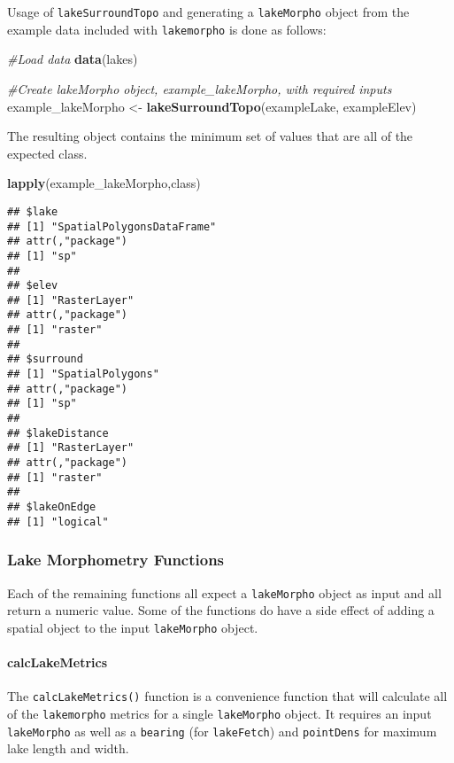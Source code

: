 \documentclass[11pt,]{article}
\newenvironment{Shaded}{\begin{snugshade}}{\end{snugshade}}
\newcommand{\KeywordTok}[1]{\textcolor[rgb]{0.13,0.29,0.53}{\textbf{{#1}}}}
\newcommand{\StringTok}[1]{\textcolor[rgb]{0.31,0.60,0.02}{{#1}}}
\newcommand{\CommentTok}[1]{\textcolor[rgb]{0.56,0.35,0.01}{\textit{{#1}}}}
\newcommand{\NormalTok}[1]{{#1}}
\begin{document}
Usage of \texttt{lakeSurroundTopo} and generating a \texttt{lakeMorpho}
object from the example data included with \texttt{lakemorpho} is done
as follows:

\begin{Shaded}
\begin{Highlighting}[]
\CommentTok{#Load data}
\KeywordTok{data}\NormalTok{(lakes)}

\CommentTok{#Create lakeMorpho object, example_lakeMorpho, with required inputs}
\NormalTok{example_lakeMorpho <-}\StringTok{ }\KeywordTok{lakeSurroundTopo}\NormalTok{(exampleLake, exampleElev)}
\end{Highlighting}
\end{Shaded}

The resulting object contains the minimum set of values that are all of
the expected class.

\begin{Shaded}
\begin{Highlighting}[]
\KeywordTok{lapply}\NormalTok{(example_lakeMorpho,class)}
\end{Highlighting}
\end{Shaded}

\begin{verbatim}
## $lake
## [1] "SpatialPolygonsDataFrame"
## attr(,"package")
## [1] "sp"
## 
## $elev
## [1] "RasterLayer"
## attr(,"package")
## [1] "raster"
## 
## $surround
## [1] "SpatialPolygons"
## attr(,"package")
## [1] "sp"
## 
## $lakeDistance
## [1] "RasterLayer"
## attr(,"package")
## [1] "raster"
## 
## $lakeOnEdge
## [1] "logical"
\end{verbatim}

\subsubsection{Lake Morphometry
Functions}\label{lake-morphometry-functions}

Each of the remaining functions all expect a \texttt{lakeMorpho} object
as input and all return a numeric value. Some of the functions do have a
side effect of adding a spatial object to the input \texttt{lakeMorpho}
object.

\paragraph{calcLakeMetrics}\label{calclakemetrics}

The \texttt{calcLakeMetrics()} function is a convenience function that
will calculate all of the \texttt{lakemorpho} metrics for a single
\texttt{lakeMorpho} object. It requires an input \texttt{lakeMorpho} as
well as a \texttt{bearing} (for \texttt{lakeFetch}) and
\texttt{pointDens} for maximum lake length and width.
\end{document}
